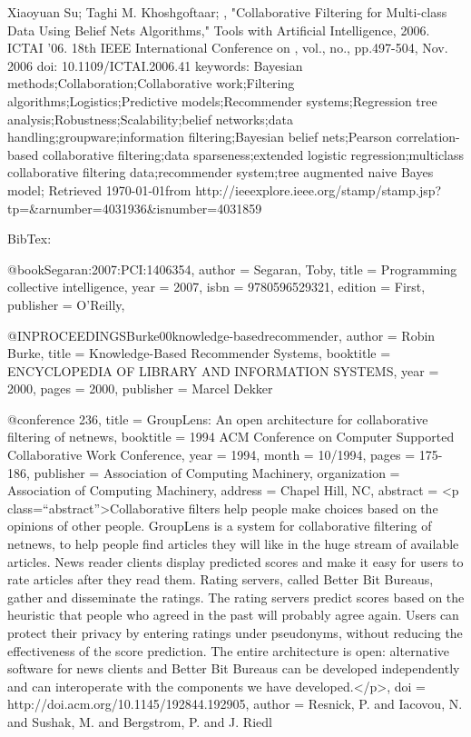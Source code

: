 \begin{thebibliography}{9}
Xiaoyuan Su; Taghi M. Khoshgoftaar; , "Collaborative Filtering for Multi-class Data Using Belief Nets Algorithms," Tools with Artificial Intelligence, 2006. ICTAI '06. 18th IEEE International Conference on , vol., no., pp.497-504, Nov. 2006
doi: 10.1109/ICTAI.2006.41
keywords: {Bayesian methods;Collaboration;Collaborative work;Filtering algorithms;Logistics;Predictive models;Recommender systems;Regression tree analysis;Robustness;Scalability;belief networks;data handling;groupware;information filtering;Bayesian belief nets;Pearson correlation-based collaborative filtering;data sparseness;extended logistic regression;multiclass collaborative filtering data;recommender system;tree augmented naive Bayes model;}
Retrieved \today from http://ieeexplore.ieee.org/stamp/stamp.jsp?tp=&arnumber=4031936&isnumber=4031859



BibTex:

@book{Segaran:2007:PCI:1406354,
author = {Segaran, Toby},
title = {Programming collective intelligence},
year = {2007},
isbn = {9780596529321},
edition = {First},
publisher = {O'Reilly},
} 


@INPROCEEDINGS{Burke00knowledge-basedrecommender,
author = {Robin Burke},
title = {Knowledge-Based Recommender Systems},
booktitle = {ENCYCLOPEDIA OF LIBRARY AND INFORMATION SYSTEMS},
year = {2000},
pages = {2000},
publisher = {Marcel Dekker}
}

@conference {236,
title = {GroupLens: An open architecture for collaborative filtering of netnews},
booktitle = {1994 ACM Conference on Computer Supported Collaborative Work Conference},
year = {1994},
month = {10/1994},
pages = {175-186},
publisher = {Association of Computing Machinery},
organization = {Association of Computing Machinery},
address = {Chapel Hill, NC},
abstract = {<p class=``abstract''>Collaborative filters help people make choices based on the opinions of other people. GroupLens is a system for collaborative filtering of netnews, to help people find articles they will like in the huge stream of available articles. News reader clients display predicted scores and make it easy for users to rate articles after they read them. Rating servers, called Better Bit Bureaus, gather and disseminate the ratings. The rating servers predict scores based on the heuristic that people who agreed in the past will probably agree again. Users can protect their privacy by entering ratings under pseudonyms, without reducing the effectiveness of the score prediction. The entire architecture is open: alternative software for news clients and Better Bit Bureaus can be developed independently and can interoperate with the components we have developed.</p>},
doi = {http://doi.acm.org/10.1145/192844.192905},
author = {Resnick, P. and Iacovou, N. and Sushak, M. and Bergstrom, P. and J. Riedl}
}


\fi

\end{thebibliography}


